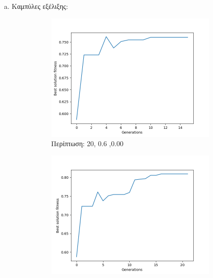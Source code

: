 \documentclass[12pt,a4paper]{article}
\begin{document}
\begin{enumerate}[a)]
            \item Καμπύλες εξέλιξης:
                \newpage
                \begin{figure}[H]
                     \centering
                     \begin{subfigure}[h]{0.7\textwidth}
                         \centering
                         \includegraphics[width=\textwidth]{images/1s.png}
                         \caption*{Περίπτωση: 20, 0.6 ,0.00}
                     \end{subfigure}
                     \hfill
                     \begin{subfigure}[h]{0.7\textwidth}
                         \centering
                         \includegraphics[width=\textwidth]{images/2s.png}

\end{subfigure}
\end{figure}
\end{enumerate}
\end{document}
